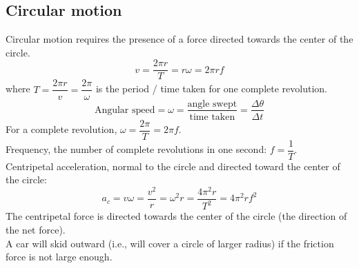 \documentclass[a4paper,12pt]{article}
\begin{document}
\subsection{Circular motion}
Circular motion requires the presence of a force directed towards the center of the circle.
\[v=\dfrac{2\pi r}{T}=r\omega=2\pi rf\]
where $T=\dfrac{2\pi r}{v}=\dfrac{2\pi}{\omega}$ is the period / time taken for one complete revolution.\\
\[\text{Angular speed} = \omega =\dfrac{\text{angle swept}}{\text{time taken}}=\dfrac{\Delta\theta}{\Delta t}\]
For a complete revolution, $\omega=\dfrac{2\pi}{T}=2\pi f$.\\
Frequency, the number of complete revolutions in one second: $f=\dfrac{1}{T}$.\\
Centripetal acceleration, normal to the circle and directed toward the center of the circle:
\[a_c=v\omega=\dfrac{v^2}{r}=\omega^2 r=\dfrac{4\pi ^2 r}{T^2}=4\pi^2rf^2\]
The centripetal force is directed towards the center of the circle (the direction of the net force). \\
A car will skid outward (i.e., will cover a circle of larger radius) if the friction force is not large enough.
\end{document}
